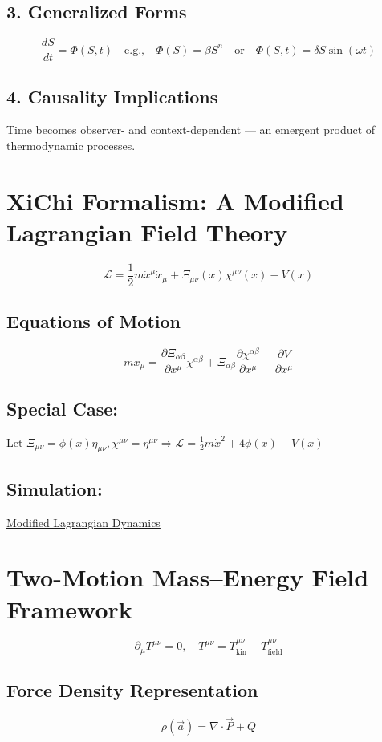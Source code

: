 \documentclass[12pt]{article}
\begin{document}
\subsection*{3. Generalized Forms}
\[
\frac{dS}{dt} = \Phi(S,t)
\quad\text{e.g.,}\quad
\Phi(S) = \beta S^n \quad \text{or} \quad \Phi(S,t) = \delta S \sin(\omega t)
\]

\subsection*{4. Causality Implications}
Time becomes observer- and context-dependent — an emergent product of thermodynamic processes.

\section{XiChi Formalism: A Modified Lagrangian Field Theory}
\[
\mathcal{L} = \frac{1}{2} m \dot{x}^\mu \dot{x}_\mu + \Xi_{\mu\nu}(x) \chi^{\mu\nu}(x) - V(x)
\]

\subsection*{Equations of Motion}
\[
m \ddot{x}_\mu = \frac{\partial \Xi_{\alpha\beta}}{\partial x^\mu} \chi^{\alpha\beta}
+ \Xi_{\alpha\beta} \frac{\partial \chi^{\alpha\beta}}{\partial x^\mu}
- \frac{\partial V}{\partial x^\mu}
\]

\subsection*{Special Case:}
Let \( \Xi_{\mu\nu} = \phi(x) \eta_{\mu\nu}, \chi^{\mu\nu} = \eta^{\mu\nu} \Rightarrow \mathcal{L} = \frac{1}{2} m \dot{x}^2 + 4\phi(x) - V(x) \)

\subsection*{Simulation:}
\href{https://www.wolframcloud.com/obj/7d3daeff-075a-4d21-a181-63349d9b2cee}{Modified Lagrangian Dynamics}

\section{Two-Motion Mass–Energy Field Framework}
\[
\partial_\mu T^{\mu\nu} = 0, \quad T^{\mu\nu} = T^{\mu\nu}_{\text{kin}} + T^{\mu\nu}_{\text{field}}
\]

\subsection*{Force Density Representation}
\[
\rho(\vec{a}) = \nabla \cdot \vec{P} + Q
\]
\end{document}
